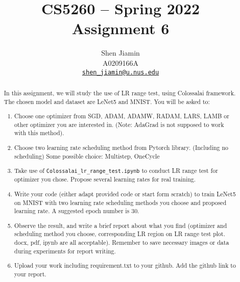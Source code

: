 \documentclass{article}
\title{\sffamily\bfseries
  CS5260 -- Spring 2022 \\
  Assignment 6
}
\author{
  Shen Jiamin \\
  A0209166A \\
  \href{mailto:shen_jiamin@u.nus.edu}{\nolinkurl{shen_jiamin@u.nus.edu}}
}
\date{}
\begin{document}
\maketitle

\begin{abstract}

In this assignment, we will study the use of LR range test, using
Colossalai framework. The chosen model and dataset are LeNet5 and
MNIST. You will be asked to:
\begin{enumerate}
    \item Choose one optimizer from SGD, ADAM, ADAMW, RADAM,
          LARS, LAMB or other optimizer you are interested in. (Note: AdaGrad
          is not supposed to work with this method).
    \item Choose two learning rate scheduling method from Pytorch library.
          (Including no scheduling) Some possible choice: Multistep, OneCycle
    \item Take use of \nolinkurl{Colossalai_lr_range_test.ipynb} to conduct LR range test
          for optimizer you chose. Propose several learning rates for real training.
    \item Write your code (either adapt provided code or start form scratch) to
          train LeNet5 on MNIST with two learning rate scheduling methods you
          choose and proposed learning rate. A suggested epoch number is 30.
    \item Observe the result, and write a brief report about what you find
          (optimizer and scheduling method you choose, corresponding LR region
          on LR range test plot. docx, pdf, ipynb are all acceptable). Remember to
          save necessary images or data during experiments for report writing.
    \item Upload your work including requirement.txt to your github. Add the
          github link to your report.
\end{enumerate}

\end{abstract}


\end{document}
